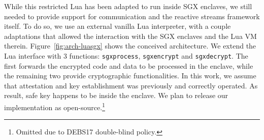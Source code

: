 While this restricted Lua has been adapted to run inside SGX enclaves, we still needed to provide support for communication and the reactive streams framework itself.
To do so, we use an external vanilla Lua interpreter, with a couple adaptations that allowed the interaction with the SGX enclaves and the Lua VM therein.
Figure~\ref{fig:arch-luasgx} shows the conceived architecture.
We extend the Lua interface with 3 functions: \texttt{sgxprocess}, \texttt{sgxencrypt} and \texttt{sgxdecrypt}. 
The first forwards the encrypted code and data to be processed in the enclave, while the remaining two provide cryptographic functionalities.
In this work, we assume that attestation and key establishment was previously and correctly operated.
As result, safe key happens to be inside the enclave.
We plan to release our implementation as open-source.\footnote{Omitted due to DEBS17 double-blind policy.}
